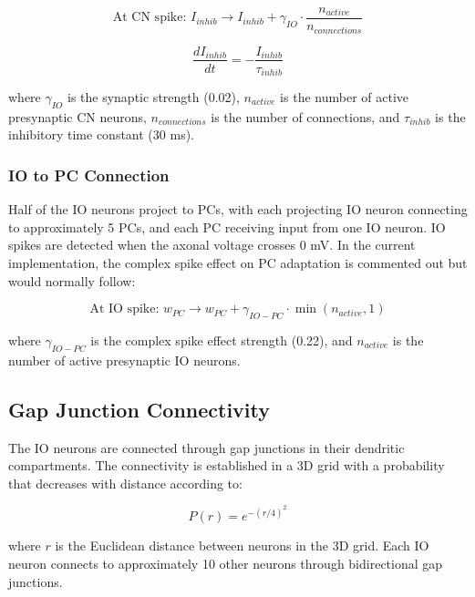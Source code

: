 \begin{equation}
\text{At CN spike: } I_{inhib} \rightarrow I_{inhib} + \gamma_{IO} \cdot \frac{n_{active}}{n_{connections}}
\end{equation}

\begin{equation}
\frac{dI_{inhib}}{dt} = -\frac{I_{inhib}}{\tau_{inhib}}
\end{equation}

where $\gamma_{IO}$ is the synaptic strength (0.02), $n_{active}$ is the number of active presynaptic CN neurons, $n_{connections}$ is the number of connections, and $\tau_{inhib}$ is the inhibitory time constant (30 ms).

\subsubsection{IO to PC Connection}

Half of the IO neurons project to PCs, with each projecting IO neuron connecting to approximately 5 PCs, and each PC receiving input from one IO neuron. IO spikes are detected when the axonal voltage crosses 0 mV. In the current implementation, the complex spike effect on PC adaptation is commented out but would normally follow:

\begin{equation}
\text{At IO spike: } w_{PC} \rightarrow w_{PC} + \gamma_{IO-PC} \cdot \min(n_{active}, 1)
\end{equation}

where $\gamma_{IO-PC}$ is the complex spike effect strength (0.22), and $n_{active}$ is the number of active presynaptic IO neurons.

\subsection{Gap Junction Connectivity}

The IO neurons are connected through gap junctions in their dendritic compartments. The connectivity is established in a 3D grid with a probability that decreases with distance according to:

\begin{equation}
P(r) = e^{-(r/4)^2}
\end{equation}

where $r$ is the Euclidean distance between neurons in the 3D grid. Each IO neuron connects to approximately 10 other neurons through bidirectional gap junctions.

